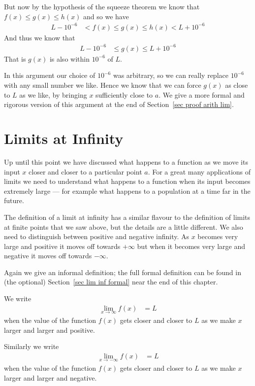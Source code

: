 But now by the hypothesis of the squeeze theorem we know that $f(x) \leq g(x) \leq h(x)$ and so we have
\begin{align*}
L-10^{-6} &< f(x) \leq g(x) \leq h(x) < L+10^{-6}
\end{align*}
And thus we know that
\begin{align}
L-10^{-6} &\leq g(x) \leq L+10^{-6}
\end{align}
That is $g(x)$ is also within $10^{-6}$ of $L$.

In this argument our choice of $10^{-6}$ was arbitrary, so we can really replace $10^{-6}$ with any small number we like.
Hence we know that we can force $g(x)$ as close to $L$ as we like, by bringing $x$ sufficiently close to $a$. We give
a more formal and rigorous version of this argument at the end of Section~\ref{sec proof arith lim}.

\section{Limits at Infinity}\label{sec_1_5}
Up until this point we have discussed what happens to a function as we move its input $x$
closer and closer to a particular point $a$. For a great many applications of
limits we need to understand what happens to a function when its input becomes
extremely large --- for example what happens to a population at a time far in
the future.

The definition of a limit at infinity has a similar flavour to the definition of limits at
finite points that we saw above, but the details are a little different. We also
need to distinguish between positive and negative infinity. As $x$ becomes
very large and positive it moves off towards $+\infty$ but when it becomes very
large and negative it moves off towards $-\infty$.


Again we give an informal definition; the full formal definition can be found
in (the optional) Section~\ref{sec lim inf formal} near the end of this chapter.
\begin{defn}\label{def_1_5_1}
We write
\begin{align*}
\lim_{x \to \infty} f(x) &= L
\end{align*}
when the value of the function $f(x)$ gets closer and closer to $L$ as we make
$x$ larger and larger and positive.

Similarly we write
\begin{align*}
\lim_{x \to -\infty} f(x) &= L
\end{align*}
when the value of the function $f(x)$ gets closer and closer to $L$ as we make
$x$ larger and larger and negative.

\end{defn}

